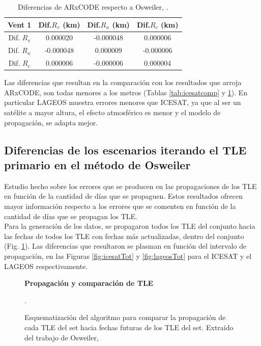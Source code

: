 \begin{table}
\caption{Diferencias de ARxCODE respecto a Osweiler, \citep{osweiler}.}
 \begin{tabular}{cccc}
  \hline
 Vent 1 & Dif.$R_{v}$ (km) & Dif.$R_{n}$ (km) & Dif.$R_{c}$ (km)\\
 \hline
 Dif. $R_{v}$ & 0.000020 &  -0.000048 &  0.000006 \\
 Dif. $R_{n}$ & -0.000048 &   0.000009 &  -0.000006 \\
 Dif. $R_{c}$ & 0.000006 &  -0.000006 &   0.000004 \\
 \hline
 \end{tabular}
 \label{tab:lageoscomp}
\end{table}

Las diferencias que resultan en la comparaci\'on con los resultados que arroja ARxCODE, son todas menores a los metros (Tablas \ref{tab:icesatcomp} y \ref{tab:lageoscomp}). En particular LAGEOS muestra errores menores que ICESAT, ya que al ser un sat\'elite a mayor altura, el efecto atmosf\'erico es menor y el modelo de propagaci\'on, se adapta mejor.\\

\subsection*{Diferencias de los escenarios iterando el TLE primario en el m\'etodo de Osweiler}
Estudio hecho sobre los errores que se producen en las propagaciones de los TLE en funci\'on de la cantidad de d\'ias que se propaguen.
Estos resultados ofrecen mayor informaci\'on respecto a los errores que se comenten en funci\'on de la cantidad de d\'ias que se propagan los TLE.\\

Para la generaci\'on de los datos, se propagaron todos los TLE del conjunto hacia las fechas de todos los TLE con fechas m\'as actualizadas, dentro del conjunto (Fig. \ref{fig:todosOSW}). Las diferencias que resultaron se plasman en funci\'on del intervalo de propagaci\'on, en las Figuras \ref{fig:icesatTot} y \ref{fig:lageosTot} para el ICESAT y el LAGEOS respectivamente. 

\begin{figure}[!h]
\centering
  \textbf{Propagaci\'on y comparaci\'on de TLE }\par\medskip
  \caption{Esquematizaci\'on del algoritmo para comparar la propagaci\'on de cada TLE del set hacia fechas futuras de los TLE del set. Extra\'ido del trabajo de Osweiler, \citep{osweiler}}.
  \label{fig:todosOSW}
\end{figure}

